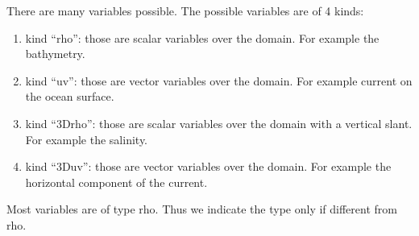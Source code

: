 \documentclass[12pt]{amsart}
\begin{document}
There are many variables possible. The possible variables are of 4 kinds:
\begin{enumerate}
\item kind ``rho'': those are scalar variables over the domain. For example the bathymetry.
\item kind ``uv'': those are vector variables over the domain. For example current on the ocean surface.
\item kind ``3Drho'': those are scalar variables over the domain with a vertical slant. For example the salinity.
\item kind ``3Duv'': those are vector variables over the domain. For example the horizontal component of the current.
\end{enumerate}
Most variables are of type rho. Thus we indicate the type only if different from rho.
\end{document}
